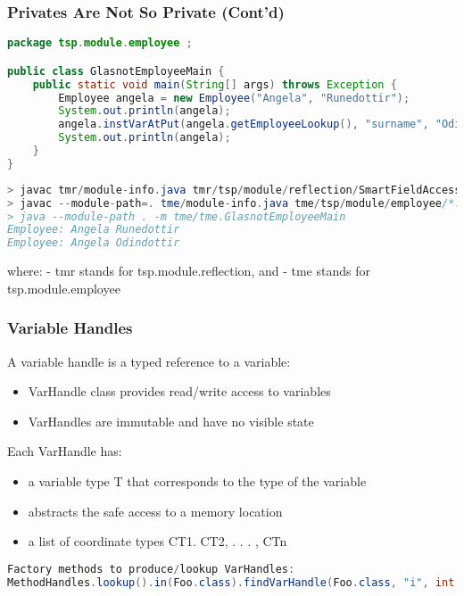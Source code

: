 \subsubsection{Privates Are Not So Private (Cont'd)}

\begin{lstlisting}[language=Java]
package tsp.module.employee ;

public class GlasnotEmployeeMain {
	public static void main(String[] args) throws Exception {
		Employee angela = new Employee("Angela", "Runedottir");
		System.out.println(angela);
		angela.instVarAtPut(angela.getEmployeeLookup(), "surname", "Odindottir");
		System.out.println(angela);
	}
}
\end{lstlisting}

\begin{lstlisting}[language=Java]
> javac tmr/module-info.java tmr/tsp/module/reflection/SmartFieldAccess.java
> javac --module-path=. tme/module-info.java tme/tsp/module/employee/*.java
> java --module-path . -m tme/tme.GlasnotEmployeeMain
Employee: Angela Runedottir
Employee: Angela Odindottir
\end{lstlisting}

where:
- tmr stands for tsp.module.reflection, and
- tme stands for tsp.module.employee

\subsubsection{Variable Handles}

A variable handle is a typed reference to a variable:

\begin{itemize}
	\item VarHandle class provides read/write access to variables
	\item VarHandles are immutable and have no visible state
\end{itemize}

Each VarHandle has:

\begin{itemize}
	\item a variable type T that corresponds to the type of the variable
	\item abstracts the safe access to a memory location
	\item a list of coordinate types CT1. CT2, . . . , CTn
\end{itemize}

\begin{lstlisting}[language=Java]
Factory methods to produce/lookup VarHandles:
MethodHandles.lookup().in(Foo.class).findVarHandle(Foo.class, "i", int.class);
\end{lstlisting}

